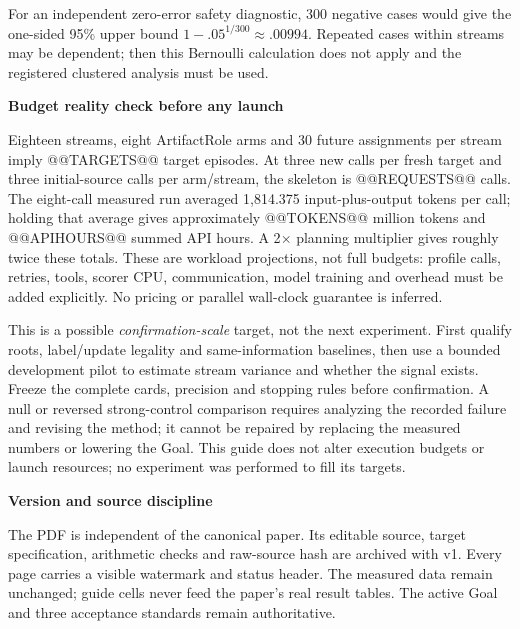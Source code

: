 \documentclass[10pt,a4paper]{article}
\newcommand{\lead}[1]{\vspace{4pt}\textbf{#1}\par}
\begin{document}
For an independent zero-error safety diagnostic, 300 negative cases would give
the one-sided 95\% upper bound $1-.05^{1/300}\approx.00994$.
Repeated cases within streams may be dependent; then this Bernoulli calculation
does not apply and the registered clustered analysis must be used.

\lead{Budget reality check before any launch}
Eighteen streams, eight ArtifactRole arms and 30 future assignments per stream
imply @@TARGETS@@ target episodes. At three new calls per fresh target and three
initial-source calls per arm/stream, the skeleton is @@REQUESTS@@ calls.
The eight-call measured run averaged 1,814.375 input-plus-output tokens per call;
holding that average gives approximately @@TOKENS@@ million tokens and
@@APIHOURS@@ summed API hours. A 2$\times$ planning multiplier gives roughly twice
these totals. These are workload projections, not full budgets: profile calls,
retries, tools, scorer CPU, communication, model training and overhead must be
added explicitly. No pricing or parallel wall-clock guarantee is inferred.

This is a possible \emph{confirmation-scale} target, not the next experiment.
First qualify roots, label/update legality and same-information baselines, then
use a bounded development pilot to estimate stream variance and whether the
signal exists. Freeze the complete cards, precision and stopping rules before
confirmation. A null or reversed strong-control comparison requires analyzing
the recorded failure and revising the method; it cannot be repaired by replacing
the measured numbers or lowering the Goal. This guide does not alter execution
budgets or launch resources; no experiment was performed to fill its targets.

\lead{Version and source discipline}
The PDF is independent of the canonical paper. Its editable source, target
specification, arithmetic checks and raw-source hash are archived with v1.
Every page carries a visible watermark and status header. The measured data
remain unchanged; guide cells never feed the paper's real result tables.
The active Goal and three acceptance standards remain authoritative.
\end{document}

